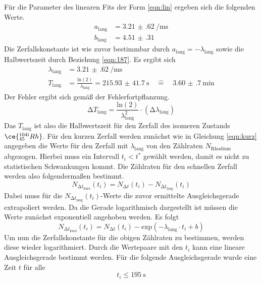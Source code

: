 Für die Parameter des linearen Fits der Form \eqref{eqn:lin} ergeben sich die folgenden Werte.
\begin{align}
a_{\text{lang}} &= \SI{3.21(62)}{\per\milli\second} \\
b_{\text{lang}} &= \SI{4.51(31)}{}
\end{align}
Die Zerfallskonstante ist wie zuvor bestimmbar durch $a_{\text{lang}} = - \lambda_{\text{lang}}$ sowie die Halbwertszeit durch Beziehung 
\eqref{eqn:187}. Es ergibt sich
\begin{align}
\lambda_{\text{lang}} &= \SI{3.21(62)}{\per\milli\second} \\[1.5pt]
T_{\text{lang}} &= \frac{\text{ln}(2)}{\lambda_{\text{lang}}} = \SI{215.93(4170)}{\second} \quad  \widehat{=} \quad \SI{3.60(70)}{\minute}
\end{align}
Der Fehler ergibt sich gemäß der Fehlerfortpflanzung.
\begin{equation}
\increment T_{\text{lang}} = \frac{\text{ln}(2)}{\lambda_{\text{lang}}^{2}} \cdot (\increment \lambda_{\text{lang}})
\end{equation}
Das $T_{\text{lang}}$ ist also die Halbwertszeit für den Zerfall des isomeren Zustands $\ce{^{104{\text{i}}}_{45}Rh}$.
Für den kurzen Zerfall werden zunächst wie in Gleichung \eqref{eqn:kurz} angegeben die Werte für den Zerfall mit $\lambda_{\text{lang}}$ von den Zählraten $N_{\text{Rhodium}}$ abgezogen. Hierbei muss
ein Intervall $t_{i} < t^{*}$ gewählt werden, damit es nicht zu statistischen Schwankungen kommt.
Die Zählraten für den schnellen Zerfall werden also folgendermaßen bestimmt.
\begin{equation}
\label{eqn:nkurz}
N_{{\increment t}_{\text{kurz}}}(t_{i}) = N_{\increment t}(t_{i}) - N_{{\increment t}_{\text{lang}}}(t_{i})
\end{equation}
Dabei muss für die $N_{{\increment t}_{\text{lang}}}(t_{i})$-Werte die zuvor ermittelte Ausgleichsgerade extrapoliert werden. Da die Gerade logarithmisch dargestellt
ist müssen die Werte zunächst exponentiell angehoben werden. Es folgt
\begin{equation}
N_{{\increment t}_{\text{kurz}}}(t_{i}) = N_{\increment t}(t_{i}) - \text{exp}(-\lambda_{\text{lang}} \cdot t_{i} + b)
\end{equation}
Um nun die Zerfallskonstante für die obigen Zählraten zu bestimmen, werden diese wieder logarithmiert. Durch die Wertepaare mit den $t_{i}$ kann eine lineare 
Ausgleichsgerade bestimmt werden. Für die folgende Ausgleichsgerade wurde eine Zeit $t$ für alle
\begin{equation*}
t_{i} \leq \SI{195}{\second}
\end{equation*}
